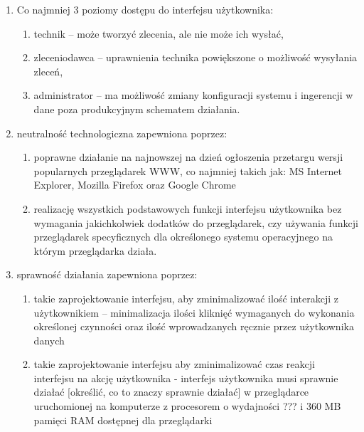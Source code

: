 \documentclass[a4paper]{report}
\begin{document}
\begin{enumerate}
    \item Co najmniej 3 poziomy dostępu do interfejsu użytkownika:
        \begin{enumerate}
        \item technik -- może tworzyć zlecenia, ale nie może ich wysłać,
        \item zleceniodawca -- uprawnienia technika powiększone o możliwość wysyłania zleceń,
        \item administrator -- ma możliwość zmiany konfiguracji systemu i ingerencji w dane poza produkcyjnym schematem działania.
        \end{enumerate}
    \item neutralność technologiczna zapewniona poprzez:
	  \begin{enumerate}
	  \item poprawne działanie na najnowszej na dzień ogłoszenia przetargu wersji popularnych przeglądarek WWW, co najmniej takich jak: MS Internet Explorer, Mozilla Firefox oraz Google Chrome
	  \item realizację wszystkich podstawowych funkcji interfejsu użytkownika bez wymagania jakichkolwiek dodatków do przeglądarek, czy używania funkcji przeglądarek specyficznych dla określonego systemu operacyjnego na którym przeglądarka działa.
	  \end{enumerate}
    \item sprawność działania zapewniona poprzez:
	  \begin{enumerate}
	  \item takie zaprojektowanie interfejsu, aby zminimalizować ilość interakcji z użytkownikiem -- minimalizacja ilości kliknięć wymaganych do wykonania określonej czynności oraz ilość wprowadzanych ręcznie przez użytkownika danych
	  \item takie zaprojektowanie interfejsu aby zminimalizować czas reakcji interfejsu na akcję użytkownika - interfejs użytkownika musi sprawnie działać [określić, co to znaczy sprawnie działać] w przeglądarce uruchomionej na komputerze z procesorem o wydajności ??? i 360 MB pamięci RAM dostępnej dla przeglądarki
	  \end{enumerate}
\end{enumerate}
\end{document}
